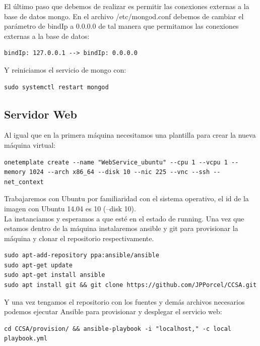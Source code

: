 El último paso que debemos de realizar es permitir las conexiones externas a la base de datos mongo. En el archivo /etc/mongod.conf debemos de cambiar el parámetro de bindIp a 0.0.0.0 de tal manera que permitamos las conexiones externas a la base de datos: \\

\begin{lstlisting}
bindIp: 127.0.0.1 --> bindIp: 0.0.0.0
\end{lstlisting}

Y reiniciamos el servicio de mongo con: \\

\begin{lstlisting}
sudo systemctl restart mongod
\end{lstlisting}

\subsection{Servidor Web}

Al igual que en la primera máquina necesitamos una plantilla para crear la nueva máquina virtual: \\

\begin{lstlisting}
onetemplate create --name "WebService_ubuntu" --cpu 1 --vcpu 1 --memory 1024 --arch x86_64 --disk 10 --nic 225 --vnc --ssh --net_context
\end{lstlisting}

Trabajaremos con Ubuntu por familiaridad con el sistema operativo, el id de la imagen con Ubuntu 14.04 es 10 (--disk 10). \\

La instanciamos y esperamos a que esté en el estado de running. Una vez que estamos dentro de la máquina instalaremos ansible y git para provisionar la máquina y clonar el repositorio respectivamente. \\

\begin{lstlisting}
sudo apt-add-repository ppa:ansible/ansible
sudo apt-get update
sudo apt-get install ansible
sudo apt install git && git clone https://github.com/JPPorcel/CCSA.git
\end{lstlisting}

Y una vez tengamos el repositorio con los fuentes y demás archivos necesarios podemos ejecutar Ansible para provisionar y desplegar el servicio web: \\

\begin{lstlisting}
cd CCSA/provision/ && ansible-playbook -i "localhost," -c local playbook.yml
\end{lstlisting}

